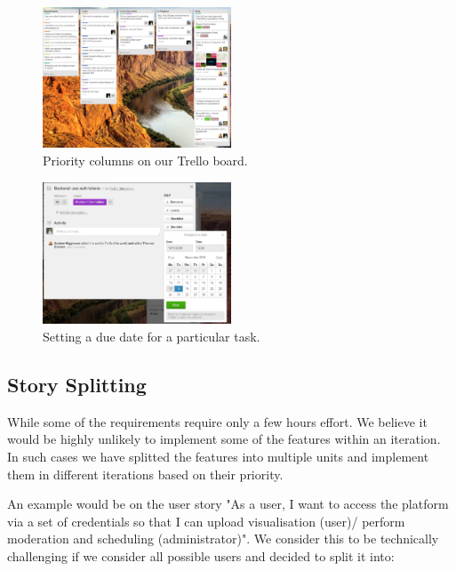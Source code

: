\documentclass[a4paper]{article}
\begin{document}
\begin{figure}[H]
  \centering
    \includegraphics[width = 0.5\textwidth]{./evaluation/trello-columns.png}

  \caption{Priority columns on our Trello board.}
  \label{fig:columns}
\end{figure}


\begin{figure}[H]
  \centering
    \includegraphics[width = 0.5\textwidth]{./evaluation/trello-due-date.png}

  \caption{Setting a due date for a particular task.}
  \label{fig:deadline}
\end{figure}




\subsection{Story Splitting}
While some of the requirements require only a few hours effort. We believe
it would be highly unlikely to implement some of the features within an
iteration. In such cases we have splitted the features into multiple units and
implement them in different iterations based on their priority.

An example would be on the user story
 "As a user, I want to access the platform via a set of
credentials so that I can upload visualisation (user)/ perform moderation and
scheduling (administrator)". We consider this to be technically challenging
if we consider all possible users and decided to split it into:
\end{document}
